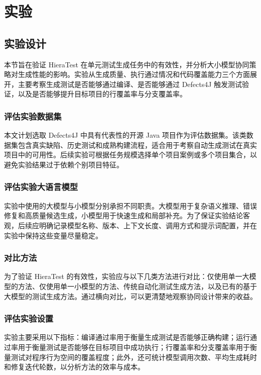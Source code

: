 \cleardoublepage

\section{实验}

\subsection{实验设计}

本节旨在验证 HieraTest 在单元测试生成任务中的有效性，并分析大小模型协同策略对生成性能的影响。实验从生成质量、执行通过情况和代码覆盖能力三个方面展开，主要考察生成测试是否能够通过编译、是否能够通过 Defects4J 触发测试验证，以及是否能够提升目标项目的行覆盖率与分支覆盖率。

\subsubsection{评估实验数据集}

本文计划选取 Defects4J 中具有代表性的开源 Java 项目作为评估数据集。该类数据集包含真实缺陷、历史测试和成熟构建流程，适合用于考察自动生成测试在真实项目中的可用性。后续实验可根据任务规模选择单个项目案例或多个项目集合，以避免实验结果过于依赖个别项目特征。

\subsubsection{评估实验大语言模型}

实验中使用的大模型与小模型分别承担不同职责。大模型用于复杂语义推理、错误修复和高质量候选生成，小模型用于快速生成和局部补充。为了保证实验结论客观，后续应明确记录模型名称、版本、上下文长度、调用方式和提示词配置，并在实验中保持这些变量尽量稳定。

\subsubsection{对比方法}

为了验证 HieraTest 的有效性，实验应与以下几类方法进行对比：仅使用单一大模型的方法、仅使用单一小模型的方法、传统自动化测试生成方法，以及已有的基于大模型的测试生成方法。通过横向对比，可以更清楚地观察协同设计带来的收益。

\subsubsection{评估实验设置}

实验主要采用以下指标：编译通过率用于衡量生成测试是否能够正确构建；运行通过率用于衡量测试是否能够在目标项目中成功执行；行覆盖率和分支覆盖率用于衡量测试对程序行为空间的覆盖程度；此外，还可统计模型调用次数、平均生成耗时和修复迭代轮数，以分析方法的效率与成本。


